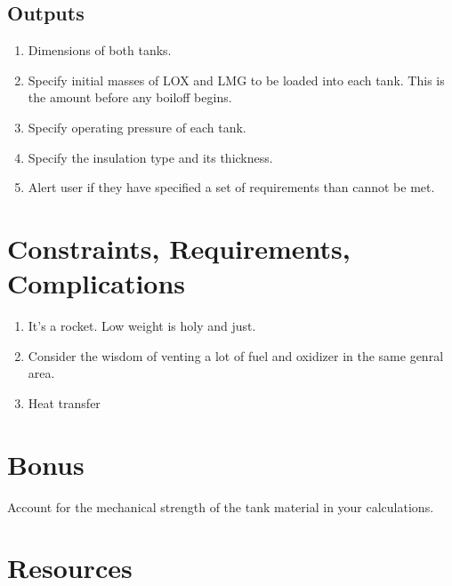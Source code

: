 \documentclass[
]{book}
\providecommand{\tightlist}{%
  \setlength{\itemsep}{0pt}\setlength{\parskip}{0pt}}
\begin{document}
\hypertarget{outputs}{%
\subsection{Outputs}\label{outputs}}

\begin{enumerate}
\def\labelenumi{\arabic{enumi}.}
\tightlist
\item
  Dimensions of both tanks.
\item
  Specify initial masses of LOX and LMG to be loaded into each tank. This is the amount before any boiloff begins.
\item
  Specify operating pressure of each tank.
\item
  Specify the insulation type and its thickness.
\item
  Alert user if they have specified a set of requirements than cannot be met.
\end{enumerate}

\hypertarget{constraints-requirements-complications}{%
\section{Constraints, Requirements, Complications}\label{constraints-requirements-complications}}

\begin{enumerate}
\def\labelenumi{\arabic{enumi}.}
\tightlist
\item
  It's a rocket. Low weight is holy and just.
\item
  Consider the wisdom of venting a lot of fuel and oxidizer in the same genral area.
\item
  Heat transfer
\end{enumerate}

\hypertarget{bonus}{%
\section{Bonus}\label{bonus}}

Account for the mechanical strength of the tank material in your calculations.

\hypertarget{resources}{%
\section{Resources}\label{resources}}
\end{document}
